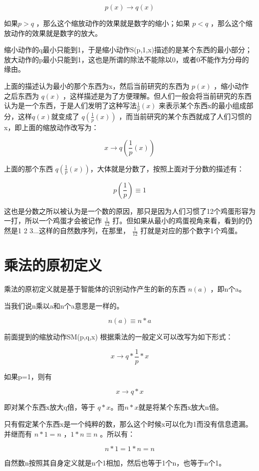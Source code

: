 \documentclass[12pt,oneside]{book}
\begin{document}
\[
p(x) \to q(x)   
\]

如果$p>q$ ，那么这个缩放动作的效果就是数字的缩小；如果 $p<q$ ，那么这个缩放动作的效果就是数字的放大。

缩小动作的q最小只能到1，于是缩小动作S(p,1,x)描述的是某个东西的最小部分；放大动作的p最小只能到1，这也是所谓的除法不能除以0，或者0不能作为分母的缘由。

上面的描述认为最小的那个东西为x，然后当前研究的东西为 $p(x)$ ，缩小动作之后东西为 $q(x)$ ，这样描述是为了方便理解。但人们一般会将当前研究的东西认为是一个东西，于是人们发明了这种写法$\frac{1}{p}(x)$ 来表示某个东西x的最小组成部分，这样$q(x)$就变成了 $q(\frac{1}{p}(x))$ ，而当前研究的某个东西就成了人们习惯的x，即上面的缩放动作改写为：


\[
x \to q(\frac{1}{p}(x))  
\]

上面的那个东西 $q(\frac{1}{p}(x))$，大体就是分数了，按照上面对于分数的描述有：

\begin{equation}
p(\frac{1}{p}) \equiv 1
\end{equation}

这也是分数之所以被认为是一个数的原因，那只是因为人们习惯了12个鸡蛋形容为一打，所以一个鸡蛋才会被记作 $\frac{1}{12}$ 打。但如果从最小的鸡蛋视角来看，看到的仍然是1 2 3...这样的自然数序列，在那里， $\frac{1}{12}$ 打就是对应的那个数字1个鸡蛋。



\section{乘法的原初定义}
乘法的原初定义就是基于智能体的识别动作产生的新的东西 $n(a)$ ，即n个a。

当我们说n乘以a和n个a意思是一样的。

\[
n(a) \equiv n*a
\]

前面提到的缩放动作SM(p,q,x) 根据乘法的一般定义可以改写为如下形式：

\[
x \to q*\frac{1}{p}*x
\]

如果p=1，则有

\[
x \to q*x
\]

即对某个东西x放大q倍，等于 $q*x$。而$n*x$就是将某个东西x放大n倍。

只有假定某个东西x是一个纯粹的数，那么这个时候x可以化为1而没有信息遗漏。并继而有 $n*1 = n$ ，$1*n \equiv n$ 。所以有：

\[
n*1 = 1*n =n
\]

自然数n按照其自身定义就是n个1相加，然后也等于1个n，也等于n个1。
\end{document}
